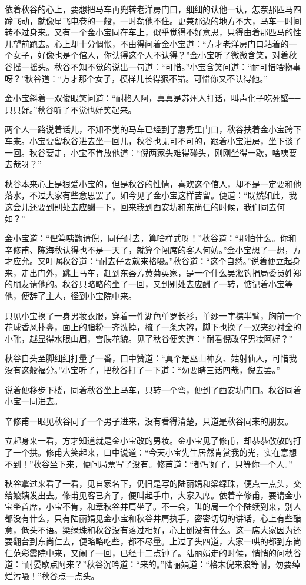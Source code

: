 \documentclass[12pt,UTF8]{ctexbook}
\begin{document}
{{{依着秋谷的心上，要想把马车再兜转老洋房门口，细细的认他一认，怎奈那匹马四蹄飞动，就像星飞电卷的一般，一时勒他不住。更兼那边的地方不大，马车一时间转不过身来。又有一个金小宝同在车上，似乎觉得不好意思，只得由着那匹马的性儿望前跑去。心上却十分惆怅，不由得问着金小宝道：“方才老洋房门口站着的一个女子，好像也是个倌人，你认得这个人不认得？”金小宝听了微微含笑，对着秋谷摇一摇头。秋谷不知不觉的说出一句道：“可惜。”小宝含笑问道：“耐可惜啥物事呀？”秋谷道：“方才那个女子，模样儿长得狠不错。可惜你又不认得他。”

金小宝斜着一双俊眼笑问道：“耐格人阿，真真是苏州人打话，叫声化子吃死蟹──只只好。”秋谷听了不觉也好笑起来。

两个人一路说着话儿，不知不觉的马车已经到了惠秀里门口，秋谷扶着金小宝跨下车来。小宝要留秋谷进去坐一回儿，秋谷也无可不可的，跟着小宝进房，坐下谈了一回。秋谷要走，小宝不肯放他道：“倪两家头难得碰头，刚刚坐得一歇，啥咦要去哉呀？”

秋谷本来心上是狠爱小宝的，但是秋谷的性情，喜欢这个倌人，却不是一定要和他落水，不过大家有些意思罢了。如今见了金小宝这样苦留。便道：“既然如此，我这会儿还要到别处去应酬一下，回来我到西安坊和东尚仁的时候，我们同去何如？”

金小宝道：“俚笃咦朆请倪，同仔耐去，算啥样式呀！”秋谷道：“那怕什么。你和辛修甫、陈海秋认得也不是一天了，就算个闯席的客人何妨。”金小宝想了一想，方才应允。又叮嘱秋谷道：“耐去仔要就来格嗫。”秋谷道：“这个自然。”说着便立起身来，走出门外，跳上马车，赶到东荟芳黄菊英家，是一个什么吴淞钓捐局委员姓郑的朋友请他的。秋谷只略略的坐了一回，又到别处去应酬了一转，惦记着小宝等他，便辞了主人，径到小宝院中来。

只见小宝换了一身男妆衣服，穿着一件湖色单罗长衫，单纱一字襟半臂，胸前一个花球香风扑鼻，面上的脂粉一齐洗掉，梳了一条大辫，脚下也换了一双夹纱衬金的小靴，越显得水眼山眉，雪肤花貌。见了秋谷便笑道：“耐看倪改仔男妆阿好？”

秋谷自头至脚细细打量了一番，口中赞道：“真个是巫山神女、姑射仙人，可惜我没有这般福分。”小宝听了，把秋谷打了一下道：“勿要瞎三话四哉，倪去罢。”

说着便移步下楼，同着秋谷坐上马车，只转一个弯，便到了西安坊门口。秋谷同着小宝一同进去。

辛修甫一眼见秋谷同了一个男子进来，没有看得清楚，只道是秋谷同来的朋友。

立起身来一看，方才知道就是金小宝改的男妆。金小宝见了修甫，却恭恭敬敬的打了一个拱。修甫大笑起来，口中说道：“今天小宝先生居然肯赏我的光，实在意想不到！”秋谷坐下来，便问局票写了没有。修甫道：“都写好了，只等你一个人。”

秋谷拿过来看了一看，见自家名下，仍旧是写的陆丽娟和梁绿珠，便点一点头，交给娘姨发出去。修甫见客已齐了，便叫起手巾，大家入席。依着辛修甫，要请金小宝坐首席，小宝不肯，和章秋谷并肩坐了。不一会，叫的局一个个陆续到来，别人都没有什么，只有陆丽娟见金小宝和秋谷并肩执手，密密切切的讲话，心上有些醋意，低头不语。梁绿珠和秋谷没有落过相好，心上倒没有什么。这一席大家因为还要翻台到东尚仁去，便略略吃些，都不尽量。上过了头四道，大家一哄的都到东尚仁范彩霞院中来，又闹了一回，已经十二点钟了。陆丽娟走的时候，悄悄的问秋谷道：“耐晏歇点阿来？”秋谷沉吟道：“来的。”陆丽娟道：“格末倪来浪等耐，勿要绰烂污嗫！”秋谷点一点头。

}}}
\end{document}
